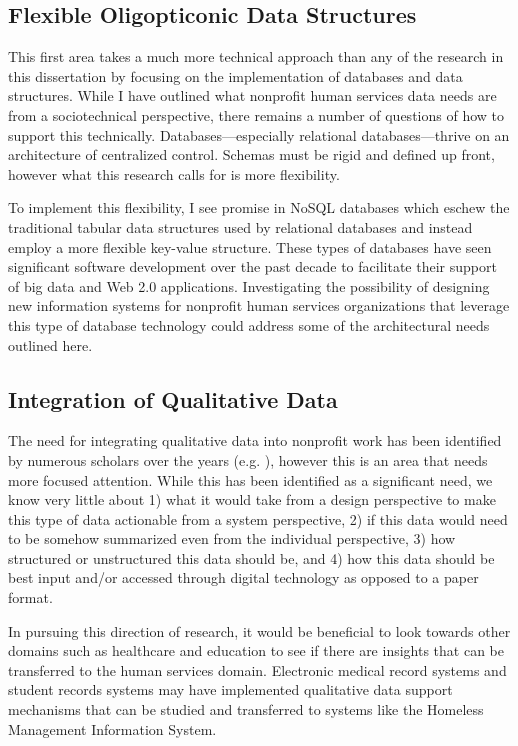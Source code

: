 \subsection{Flexible Oligopticonic Data Structures}
This first area takes a much more technical approach than any of the research in this dissertation by focusing on the implementation of databases and data structures. While I have outlined what nonprofit human services data needs are from a sociotechnical perspective, there remains a number of questions of how to support this technically. Databases---especially relational databases---thrive on an architecture of centralized control. Schemas must be rigid and defined up front, however what this research calls for is more flexibility.

To implement this flexibility, I see promise in NoSQL databases which eschew the traditional tabular data structures used by relational databases and instead employ a more flexible key-value structure. These types of databases have seen significant software development over the past decade to facilitate their support of big data and Web 2.0 applications. Investigating the possibility of designing new information systems for nonprofit human services organizations that leverage this type of database technology could address some of the architectural needs outlined here.

\subsection{Integration of Qualitative Data}
The need for integrating qualitative data into nonprofit work has been identified by numerous scholars over the years (e.g. \citet{LeDantec2008Trenches,Verma2016DrillDown}), however this is an area that needs more focused attention. While this has been identified as a significant need, we know very little about 1) what it would take from a design perspective to make this type of data actionable from a system perspective, 2) if this data would need to be somehow summarized even from the individual perspective, 3) how structured or unstructured this data should be, and 4) how this data should be best input and/or accessed through digital technology as opposed to a paper format.

In pursuing this direction of research, it would be beneficial to look towards other domains such as healthcare and education to see if there are insights that can be transferred to the human services domain. Electronic medical record systems and student records systems may have implemented qualitative data support mechanisms that can be studied and transferred to systems like the Homeless Management Information System.

